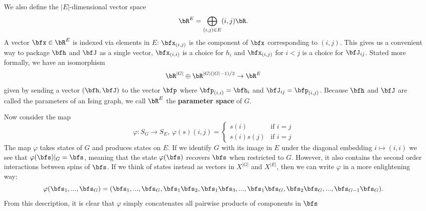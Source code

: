 \documentclass[raggedright, nofonts, notitlepage, openany, debug]{tufte-book}
\begin{document}
We also define the $|E|$-dimensional vector space
\begin{align*}
  \bR^E = \bigoplus_{(i,j) \in E} (i,j)\bR.
\end{align*}
A vector $\bfx \in \bR^E$ is indexed via elements in $E$: $\bfx_{(i,j)}$ is the component of $\bfx$ corresponding to $(i,j)$. This gives us a convenient way to package $\bfh$ and $\bfJ$ as a single vector, $\bfx_{(i,i)}$ is a choice for $h_i$ and $\bfx_{(i,j)}$ for $i < j$ is a choice for $\bfJ_{ij}$. Stated more formally, we have an isomorphism
\begin{equation}\label{eqn:parameter_space_iso}
  \bR^{|G|} \oplus \bR^{|G|(|G| - 1)/2}\to \bR^E
\end{equation}
given by sending a vector $(\bfh, \bfJ)$ to the vector $\bfp$ where $\bfp_{(i,i)} = \bfh_i$ and $\bfJ_{ij} = \bfp_{(i,j)}$. Because $\bfh$ and $\bfJ$ are called the parameters of an Ising graph, we call $\bR^E$ the \textbf{parameter space} of $G$.

Now consider the map
\begin{equation}\label{eqn:virtual_map}
  \varphi:S_G \to S_E, ~\varphi(s)(i,j) = 
  \begin{cases}
    s(i) & \text{if } i = j \\
    s(i)s(j) & \text{if } i = j
  \end{cases}
\end{equation}
The map $\varphi$ takes states of $G$ and produces states on $E$. If we identify $G$ with its image in $E$ under the diagonal embedding $i \mapsto (i,i)$ we see that $\varphi(\bfs)|_{G} = \bfs$, meaning that the state $\varphi(\bfs)$ recovers $\bfs$ when restricted to $G$. However, it also contains the second order interactions between spins of $\bfs$. If we think of states instead as vectors in $X^{|G|}$ and $X^{|E|}$, then we can write $\varphi$ in a more enlightening way:
\begin{equation}\label{eqn:hamiltonian_is_dot_product_in_virtual_spinspace}
\varphi(\bfs_1,...,\bfs_{G}) = (\bfs_1,...,\bfs_G,\bfs_1\bfs_2,\bfs_1\bfs_3,...,\bfs_1\bfs_G,\bfs_2\bfs_G,...,\bfs_{G-1}\bfs_{G}).
\end{equation}
From this description, it is clear that $\varphi$ simply concatenates all pairwise products of components in $\bfs$ 
\end{document}
